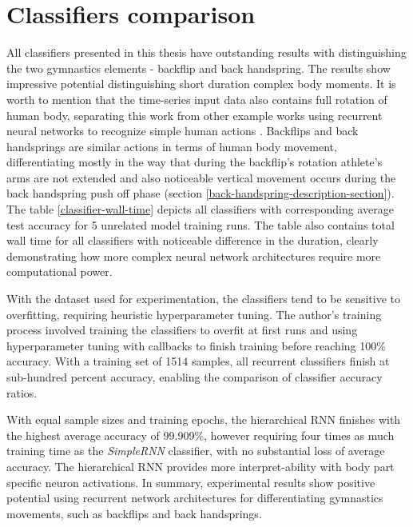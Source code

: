 \begin{comment}

\end{comment}

\section{Classifiers comparison}

All classifiers presented in this thesis have outstanding results with distinguishing the two gymnastics elements - backflip and back handspring. The results show impressive potential distinguishing short duration complex body moments. It is worth to mention that the time-series input data also contains full rotation of human body, separating this work from other example works using recurrent neural networks to recognize simple human actions \cite{sawant2020human}. Backflips and back handsprings are similar actions in terms of human body movement, differentiating mostly in the way that during the backflip's rotation athlete's arms are not extended and also noticeable vertical movement occurs during the back handspring push off phase (section \ref{back-handspring-description-section}). The table \ref{classifier-wall-time} depicts all classifiers with corresponding average test accuracy for 5 unrelated model training runs. The table also contains total wall time for all classifiers with noticeable difference in the duration, clearly demonstrating how more complex neural network architectures require more computational power. 

With the dataset used for experimentation, the classifiers tend to be sensitive to overfitting, requiring heuristic hyperparameter tuning. The author's training process involved training the classifiers to overfit at first runs and using hyperparameter tuning with callbacks to finish training before reaching 100\% accuracy. With a training set of 1514 samples, all recurrent classifiers finish at sub-hundred percent accuracy, enabling the comparison of classifier accuracy ratios.

With equal sample sizes and training epochs, the hierarchical RNN finishes with the highest average accuracy of 99.909\%, however requiring four times as much training time as the \textit{SimpleRNN} classifier, with no substantial loss of average accuracy. The hierarchical RNN provides more interpret-ability with body part specific neuron activations. In summary, experimental results show positive potential using recurrent network architectures for differentiating gymnastics movements, such as backflips and back handsprings. 

